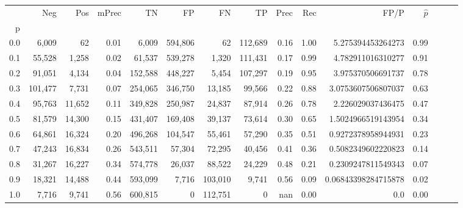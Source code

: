 \begin{tabular}{rrrrrrrrrrrrrrr}
\toprule
{} &      Neg &     Pos & mPrec &       TN &       FP &       FN &       TP &  Prec &   Rec &                 FP/P & $\hat{p}$ \\
p   &          &         &       &          &          &          &          &       &       &                      &           \\
\midrule
0.0 &    6,009 &      62 &  0.01 &    6,009 &  594,806 &       62 &  112,689 &  0.16 &  1.00 &    5.275394453264273 &      0.99 \\
0.1 &   55,528 &   1,258 &  0.02 &   61,537 &  539,278 &    1,320 &  111,431 &  0.17 &  0.99 &    4.782911016310277 &      0.91 \\
0.2 &   91,051 &   4,134 &  0.04 &  152,588 &  448,227 &    5,454 &  107,297 &  0.19 &  0.95 &    3.975370506691737 &      0.78 \\
0.3 &  101,477 &   7,731 &  0.07 &  254,065 &  346,750 &   13,185 &   99,566 &  0.22 &  0.88 &   3.0753607506807037 &      0.63 \\
0.4 &   95,763 &  11,652 &  0.11 &  349,828 &  250,987 &   24,837 &   87,914 &  0.26 &  0.78 &    2.226029037436475 &      0.47 \\
0.5 &   81,579 &  14,300 &  0.15 &  431,407 &  169,408 &   39,137 &   73,614 &  0.30 &  0.65 &   1.5024966519143954 &      0.34 \\
0.6 &   64,861 &  16,324 &  0.20 &  496,268 &  104,547 &   55,461 &   57,290 &  0.35 &  0.51 &   0.9272378958944931 &      0.23 \\
0.7 &   47,243 &  16,834 &  0.26 &  543,511 &   57,304 &   72,295 &   40,456 &  0.41 &  0.36 &   0.5082349602220823 &      0.14 \\
0.8 &   31,267 &  16,227 &  0.34 &  574,778 &   26,037 &   88,522 &   24,229 &  0.48 &  0.21 &   0.2309247811549343 &      0.07 \\
0.9 &   18,321 &  14,488 &  0.44 &  593,099 &    7,716 &  103,010 &    9,741 &  0.56 &  0.09 &  0.06843398284715878 &      0.02 \\
1.0 &    7,716 &   9,741 &  0.56 &  600,815 &        0 &  112,751 &        0 &   nan &  0.00 &                  0.0 &      0.00 \\
\bottomrule
\end{tabular}
